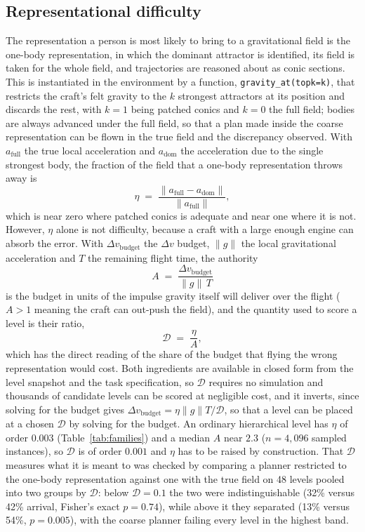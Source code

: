 \documentclass[11pt]{article}
\newcommand{\dd}{\mathcal{D}}
\newcommand{\code}[1]{\texttt{\small #1}}
\begin{document}
\subsection{Representational difficulty}
\label{sec:eta}

The representation a person is most likely to bring to a gravitational field
is the one-body representation, in which the dominant attractor is
identified, its field is taken for the whole field, and trajectories are
reasoned about as conic sections. This is instantiated in the environment by
a function, \code{gravity\_at(topk=k)}, that restricts the craft's felt
gravity to the $k$ strongest attractors at its position and discards the
rest, with $k = 1$ being patched conics and $k = 0$ the full field; bodies
are always advanced under the full field, so that a plan made inside the
coarse representation can be flown in the true field and the discrepancy
observed. With $a_{\mathrm{full}}$ the true local acceleration and
$a_{\mathrm{dom}}$ the acceleration due to the single strongest body, the
fraction of the field that a one-body representation throws away is
\begin{equation}
\eta \;=\; \frac{\lVert a_{\mathrm{full}} - a_{\mathrm{dom}} \rVert}
{\lVert a_{\mathrm{full}} \rVert},
\end{equation}
which is near zero where patched conics is adequate and near one where it is
not. However, $\eta$ alone is not difficulty, because a craft with a large
enough engine can absorb the error. With $\Delta v_{\mathrm{budget}}$ the
$\Delta v$ budget, $\lVert g \rVert$ the local gravitational acceleration and
$T$ the remaining flight time, the authority
\begin{equation}
A \;=\; \frac{\Delta v_{\mathrm{budget}}}{\lVert g\rVert\, T}
\end{equation}
is the budget in units of the impulse gravity itself will deliver over the
flight ($A > 1$ meaning the craft can out-push the field), and the quantity
used to score a level is their ratio,
\begin{equation}
\dd \;=\; \frac{\eta}{A},
\end{equation}
which has the direct reading of the share of the budget that flying the
wrong representation would cost. Both ingredients are available in closed
form from the level snapshot and the task specification, so $\dd$ requires
no simulation and thousands of candidate levels can be scored at negligible
cost, and it inverts, since solving for the budget gives
$\Delta v_{\mathrm{budget}} = \eta \lVert g \rVert T / \dd$, so that a level
can be placed at a chosen $\dd$ by solving for the budget. An ordinary
hierarchical level has $\eta$ of order $0.003$ (Table~\ref{tab:families})
and a median $A$ near $2.3$ ($n = 4{,}096$ sampled instances), so $\dd$ is
of order $0.001$ and $\eta$ has to be raised by construction. That $\dd$
measures what it is meant to was checked by comparing a planner restricted
to the one-body representation against one with the true field on 48
levels pooled into two groups by $\dd$: below $\dd = 0.1$ the two were
indistinguishable (32\% versus 42\% arrival, Fisher's exact $p = 0.74$),
while above it they separated (13\% versus 54\%, $p = 0.005$), with the
coarse planner failing every level in the highest band.
\end{document}
